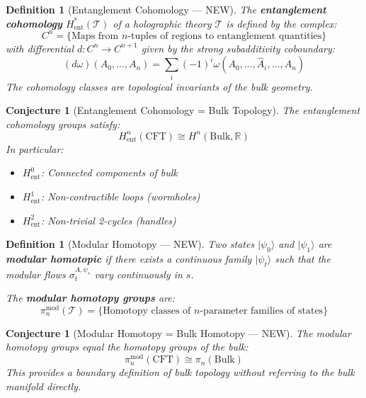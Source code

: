 \documentclass[12pt,a4paper]{article}
\newtheorem{conjecture}[theorem]{Conjecture}
\newtheorem{definition}[theorem]{Definition}
\begin{document}
\begin{definition}[Entanglement Cohomology --- NEW]
The \textbf{entanglement cohomology} $H^*_{\text{ent}}(\mathcal{T})$ of a holographic theory $\mathcal{T}$ is defined by the complex:
\begin{equation}
C^n = \{ \text{Maps from } n\text{-tuples of regions to entanglement quantities} \}
\end{equation}
with differential $d: C^n \to C^{n+1}$ given by the strong subadditivity coboundary:
\begin{equation}
(d\omega)(A_0, \ldots, A_n) = \sum_i (-1)^i \omega(A_0, \ldots, \hat{A}_i, \ldots, A_n)
\end{equation}
The cohomology classes are topological invariants of the bulk geometry.
\end{definition}

\begin{conjecture}[Entanglement Cohomology = Bulk Topology]
The entanglement cohomology groups satisfy:
\begin{equation}
H^n_{\text{ent}}(\text{CFT}) \cong H^n(\text{Bulk}, \mathbb{R})
\end{equation}
In particular:
\begin{itemize}
    \item $H^0_{\text{ent}}$: Connected components of bulk
    \item $H^1_{\text{ent}}$: Non-contractible loops (wormholes)
    \item $H^2_{\text{ent}}$: Non-trivial 2-cycles (handles)
\end{itemize}
\end{conjecture}

\begin{definition}[Modular Homotopy --- NEW]
Two states $|\psi_0\rangle$ and $|\psi_1\rangle$ are \textbf{modular homotopic} if there exists a continuous family $|\psi_t\rangle$ such that the modular flows $\sigma_t^{A,\psi_s}$ vary continuously in $s$.

The \textbf{modular homotopy groups} are:
\begin{equation}
\pi_n^{\text{mod}}(\mathcal{T}) = \{ \text{Homotopy classes of } n\text{-parameter families of states} \}
\end{equation}
\end{definition}

\begin{conjecture}[Modular Homotopy = Bulk Homotopy --- NEW]
The modular homotopy groups equal the homotopy groups of the bulk:
\begin{equation}
\pi_n^{\text{mod}}(\text{CFT}) \cong \pi_n(\text{Bulk})
\end{equation}
This provides a boundary definition of bulk topology without referring to the bulk manifold directly.
\end{conjecture}
\end{document}
